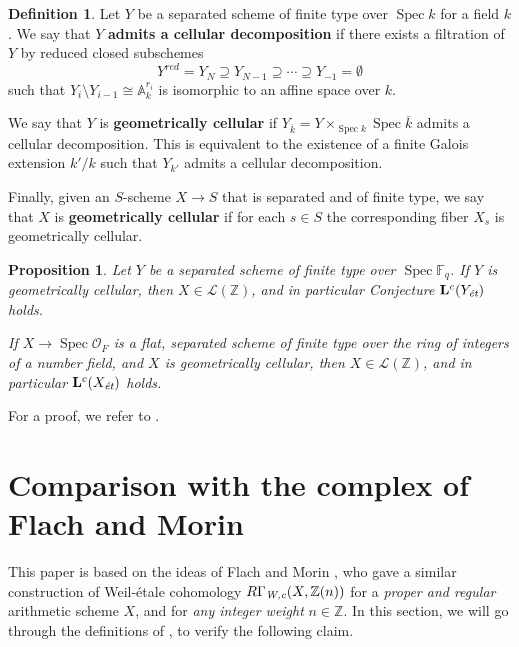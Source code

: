 \documentclass[leqno,12pt]{article}
\theoremstyle{plain}
\newtheorem{proposition}[theorem]{\indent\sc Proposition}
\theoremstyle{definition}
\newtheorem{definition}[theorem]{\indent\sc Definition}
\DeclareMathOperator{\Spec}{Spec}
\newcommand{\FF}{\mathbb{F}}
\newcommand{\ZZ}{\mathbb{Z}}
\renewcommand{\AA}{\mathbb{A}}
\newcommand{\Wc}{\text{\it W,c}}
\newcommand{\et}{\text{\it \'{e}t}}
\begin{document}
\begin{definition}
  Let $Y$ be a separated scheme of finite type over $\Spec k$ for a field
  $k$. We say that $Y$ \textbf{admits a cellular decomposition} if there exists
  a filtration of $Y$ by reduced closed subschemes
  $$Y^{red} = Y_N \supseteq Y_{N-1} \supseteq \cdots \supseteq Y_{-1} = \emptyset$$
  such that $Y_i\setminus Y_{i-1} \cong \AA^{r_i}_k$ is isomorphic to an affine
  space over $k$.

  We say that $Y$ is \textbf{geometrically cellular} if
  $Y_{\overline{k}} = Y \times_{\Spec k} \Spec \overline{k}$ admits a cellular
  decomposition. This is equivalent to the existence of a finite Galois
  extension $k'/k$ such that $Y_{k'}$ admits a cellular decomposition.

  Finally, given an $S$-scheme $X \to S$ that is separated and of finite type,
  we say that $X$ is \textbf{geometrically cellular} if for each $s \in S$ the
  corresponding fiber $X_s$ is geometrically cellular.
\end{definition}

\begin{proposition}
  Let $Y$ be a separated scheme of finite type over $\Spec \FF_q$.
  If $Y$ is geometrically cellular, then $X \in \mathcal{L} (\ZZ)$,
  and in particular Conjecture $\mathbf{L}^c (Y_\et)$ holds.

  If $X \to \Spec \mathcal{O}_F$ is a flat, separated scheme of finite type over
  the ring of integers of a number field, and $X$ is geometrically cellular,
  then $X \in \mathcal{L} (\ZZ)$, and in particular $\mathbf{L}^c (X_\et)$
  holds.
\end{proposition}

For a proof, we refer to \cite[Proposition~5.14]{Morin-2014}.


\section{Comparison with the complex of Flach and Morin}
\label{sec:comparison-with-FM}

This paper is based on the ideas of Flach and Morin \cite{Flach-Morin-2018}, who
gave a similar construction of Weil-\'{e}tale cohomology
$R\Gamma_\Wc (X, \ZZ(n))$ for a \emph{proper and regular} arithmetic scheme $X$,
and for \emph{any integer weight} $n \in \ZZ$. In this section, we will go
through the definitions of \cite{Flach-Morin-2018}, to verify the following
claim.
\end{document}
